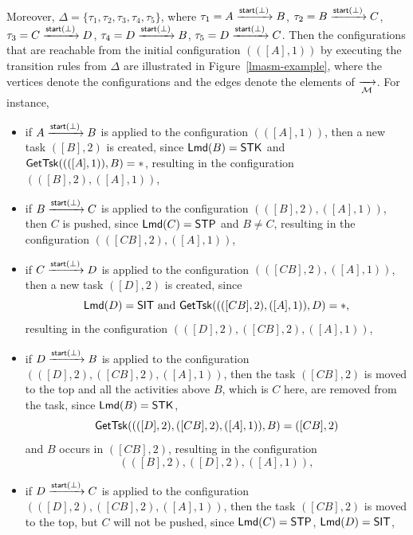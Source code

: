 \begin{example}
		Moreover, $\Delta = \{\tau_1, \tau_2, \tau_3, \tau_4, \tau_5\}$, where 
		$\tau_1 = A \xrightarrow{{\mathsf{start} }(\bot)} B$,
		$\tau_2 = B \xrightarrow{{\mathsf{start} }(\bot)} C$,
		$\tau_3 = C \xrightarrow{{\mathsf{start} }(\bot)} D$,
		$\tau_4 = D \xrightarrow{{\mathsf{start} }(\bot)} B$,
		$\tau_5 = D \xrightarrow{{\mathsf{start} }(\bot)} C$.
		Then the configurations that are reachable from the initial configuration $(([A], 1))$ by executing the transition rules from $\Delta$ are illustrated in Figure~\ref{lmasm-example}, where the vertices denote the configurations and the edges denote the elements of $\xrightarrow[{\mathcal{M} }]{}$. 
		For instance, 
		\begin{itemize}
			\item if $A \xrightarrow{{\mathsf{start} }(\bot)} B$ is applied to the configuration $(([A], 1))$, then a new task $([B],2)$ is created, since ${\sf Lmd}(B) = \mathsf{STK}$ and $\mathsf{GetTsk}((([A],1)), B) = *$, resulting in the configuration $(([B],2),([A],1))$,
			\item if $B \xrightarrow{{\mathsf{start} }(\bot)} C$ is applied to the configuration $(([B],2),([A],1))$, then $C$ is pushed, since ${\sf Lmd}(C) = \mathsf{STP}$ and $B\neq C$, resulting in the configuration $(([CB],2),([A],1))$,
			\item if $C \xrightarrow{{\mathsf{start} }(\bot)} D$ is applied to the configuration $(([CB],2),([A],1))$, then a new task $([D], 2)$ is created, since 
			$${\sf Lmd}(D) = \mathsf{SIT} \mbox{ and } \mathsf{GetTsk}((([CB],2),([A],1)), D) = *,$$ 
			resulting in the configuration $(([D],2),([CB],2),([A],1))$,
			\item if $D \xrightarrow{{\mathsf{start} }(\bot)} B$ is applied to the configuration $(([D],2),([CB],2),([A],1))$, then the task $([CB],2)$ is moved to the top and all the activities above $B$, which is $C$ here, are removed from the task, since ${\sf Lmd}(B) = \mathsf{STK}$, 
			$$\mathsf{GetTsk}((([D],2),([CB],2),([A],1)), B) = ([CB],2)$$
			and $B$ occurs in $([CB], 2)$, resulting in the configuration 
			$$(([B],2),([D],2),([A],1)),$$
			\item if $D \xrightarrow{{\mathsf{start} }(\bot)} C$ is applied to the configuration $(([D],2),([CB],2),([A],1))$, then the task $([CB],2)$ is moved to the top, but $C$ will not be pushed, since ${\sf Lmd}(C) = \mathsf{STP}$, ${\sf Lmd}(D) = \mathsf{SIT}$,

\end{itemize}
\end{example}
